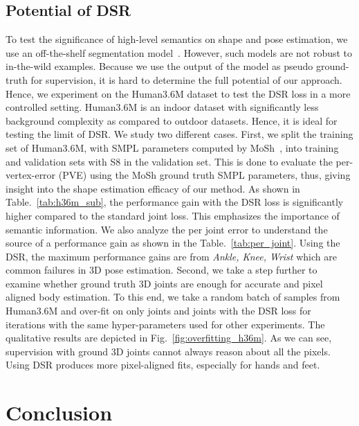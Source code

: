 \documentclass[10pt,twocolumn,letterpaper]{article}
\newcommand{\modelname}[0]{DSR\xspace}
\begin{document}
\subsection{Potential of \modelname}
To test the significance of high-level semantics on shape and pose estimation, we use an off-the-shelf segmentation model~\cite{graphonomy}. However, such models are not robust to in-the-wild examples. Because we use the output of the model as pseudo ground-truth for supervision, it is hard to determine the full potential of our approach. Hence, we experiment on the Human3.6M dataset to test the \modelname loss in a more controlled setting. Human3.6M is an indoor dataset with significantly less background complexity as compared to outdoor datasets. Hence, it is ideal for testing the limit of \modelname. We study two different cases.
First, we split the training set of Human3.6M, with SMPL parameters computed by MoSh~\cite{mosh}, into training and validation sets with S8 in the validation set. This is done to evaluate the per-vertex-error (PVE) using the MoSh ground truth SMPL parameters, thus, giving insight into the shape estimation efficacy of our method. As shown in Table.~\ref{tab:h36m_sub}, the performance gain with the \modelname loss is significantly higher compared to the standard joint loss. This emphasizes the importance of semantic information. We also analyze the per joint error to understand the source of a performance gain as shown in the Table.~\ref{tab:per_joint}. Using the \modelname, the maximum performance gains are from \emph{Ankle, Knee, Wrist} which are common failures in 3D pose estimation.
Second, we take a step further to examine whether ground truth 3D joints are enough for accurate and pixel aligned body estimation. To this end, we take a random batch of  samples from Human3.6M and over-fit on only joints and joints with the \modelname loss for  iterations with the same hyper-parameters used for other experiments. The qualitative results are depicted in Fig.~\ref{fig:overfitting_h36m}. As we can see, supervision with ground 3D joints cannot always reason about all the pixels. Using \modelname produces more pixel-aligned fits, especially for hands and feet. \section{Conclusion}
\end{document}
